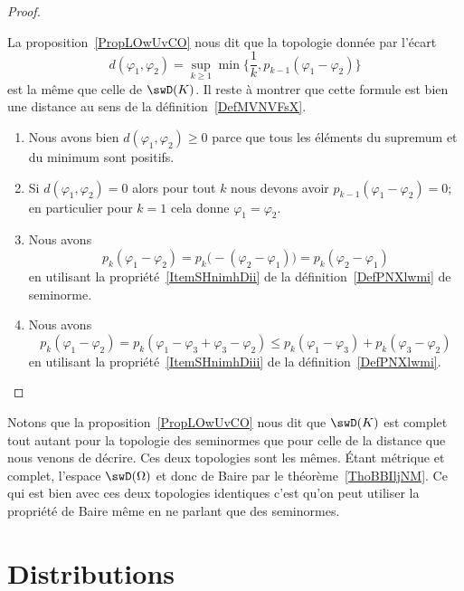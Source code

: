 \begin{proof}
\begin{subproof}
		\spitem[Métrique]

		La proposition~\ref{PropLOwUvCO} nous dit que la topologie donnée par l'écart
		\begin{equation}
			d(\varphi_1,\varphi_2)=\sup_{k\geq 1}\min\{ \frac{1}{ k },p_{k-1}(\varphi_1-\varphi_2) \}
		\end{equation}
		est la même que celle de \( \swD(K)\). Il reste à montrer que cette formule est bien une distance au sens de la définition~\ref{DefMVNVFsX}.
		\begin{enumerate}
			\item
			      Nous avons bien \( d(\varphi_1,\varphi_2)\geq 0\) parce que tous les éléments du supremum et du minimum sont positifs.
			\item
			      Si \( d(\varphi_1,\varphi_2)=0\) alors pour tout \( k\) nous devons avoir \( p_{k-1}(\varphi_1-\varphi_2)=0\); en particulier pour \( k=1\) cela donne \( \varphi_1=\varphi_2\).
			\item
			      Nous avons
			      \begin{equation}
				      p_k(\varphi_1-\varphi_2)=p_k\big( -(\varphi_2-\varphi_1) \big)=p_k(\varphi_2-\varphi_1)
			      \end{equation}
			      en utilisant la propriété~\ref{ItemSHnimhDii} de la définition~\ref{DefPNXlwmi} de seminorme.
			\item
			      Nous avons
			      \begin{equation}
				      p_k(\varphi_1-\varphi_2)=p_k(\varphi_1-\varphi_3+\varphi_3-\varphi_2)\leq p_k(\varphi_1-\varphi_3)+p_k(\varphi_3-\varphi_2)
			      \end{equation}
			      en utilisant la propriété~\ref{ItemSHnimhDiii} de la définition~\ref{DefPNXlwmi}.
		\end{enumerate}
	\end{subproof}
\end{proof}
Notons que la proposition~\ref{PropLOwUvCO} nous dit que \( \swD(K)\) est complet tout autant pour la topologie des seminormes que pour celle de la distance que nous venons de décrire. Ces deux topologies sont les mêmes. Étant métrique et complet, l'espace \( \swD(\Omega)\) et donc de Baire par le théorème~\ref{ThoBBIljNM}. Ce qui est bien avec ces deux topologies identiques c'est qu'on peut utiliser la propriété de Baire même en ne parlant que des seminormes.

\section{Distributions}

